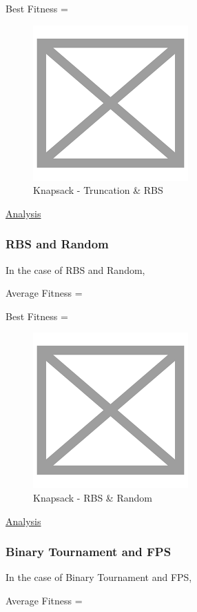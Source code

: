 \documentclass[11pt, letterpaper]{article}
\begin{document}
Best Fitness = 
\begin{figure}[H]
    \centering
    \includegraphics[scale = 0.6]{images/placeHolder.png}
    \caption {Knapsack - Truncation \& RBS}
    \label {fig:tpsTR}
\end{figure}

\underline{Analysis}
\subsubsection {RBS and Random}
In the case of RBS and Random,

Average Fitness = 

Best Fitness = 
\begin{figure}[H]
    \centering
    \includegraphics[scale = 0.6]{images/placeHolder.png}
    \caption {Knapsack - RBS \& Random}
    \label {fig:tpsRbR}
\end{figure}

\underline{Analysis}
\subsubsection {Binary Tournament and FPS}
In the case of Binary Tournament and FPS,

Average Fitness = 
\end{document}
